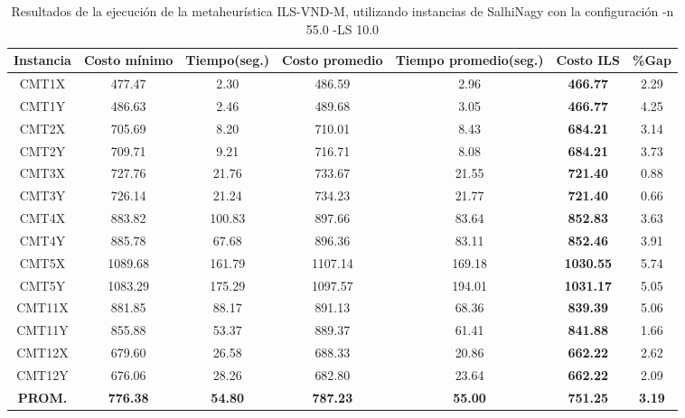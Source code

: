 \begin{table}[h]
\caption{Resultados de la ejecución de la metaheurística ILS-VND-M, utilizando instancias de SalhiNagy con la configuración -n 55.0 -LS 10.0}
\centering
\small
\begin{tabular}{c c c c c c c}
\hline\hline
Instancia & Costo mínimo & Tiempo(seg.) & Costo promedio & Tiempo promedio(seg.) & Costo ILS & \%Gap \\ [0.5ex]
\hline
CMT1X & 477.47 & 2.30 & 
486.59 & 2.96 & \bf{466.77} & 
2.29\\CMT1Y & 486.63 & 2.46 & 
489.68 & 3.05 & \bf{466.77} & 
4.25\\CMT2X & 705.69 & 8.20 & 
710.01 & 8.43 & \bf{684.21} & 
3.14\\CMT2Y & 709.71 & 9.21 & 
716.71 & 8.08 & \bf{684.21} & 
3.73\\CMT3X & 727.76 & 21.76 & 
733.67 & 21.55 & \bf{721.40} & 
0.88\\CMT3Y & 726.14 & 21.24 & 
734.23 & 21.77 & \bf{721.40} & 
0.66\\CMT4X & 883.82 & 100.83 & 
897.66 & 83.64 & \bf{852.83} & 
3.63\\CMT4Y & 885.78 & 67.68 & 
896.36 & 83.11 & \bf{852.46} & 
3.91\\CMT5X & 1089.68 & 161.79 & 
1107.14 & 169.18 & \bf{1030.55} & 
5.74\\CMT5Y & 1083.29 & 175.29 & 
1097.57 & 194.01 & \bf{1031.17} & 
5.05\\CMT11X & 881.85 & 88.17 & 
891.13 & 68.36 & \bf{839.39} & 
5.06\\CMT11Y & 855.88 & 53.37 & 
889.37 & 61.41 & \bf{841.88} & 
1.66\\CMT12X & 679.60 & 26.58 & 
688.33 & 20.86 & \bf{662.22} & 
2.62\\CMT12Y & 676.06 & 28.26 & 
682.80 & 23.64 & \bf{662.22} & 
2.09\\\bf{PROM.} & 
\bf{776.38} & \bf{54.80} & \bf{787.23} & \bf{55.00} & \bf{751.25} & \bf{3.19}\\[1ex]\hline
\end{tabular}
\label{table:ILS-VND-M-55-10-S}
\end{table}


